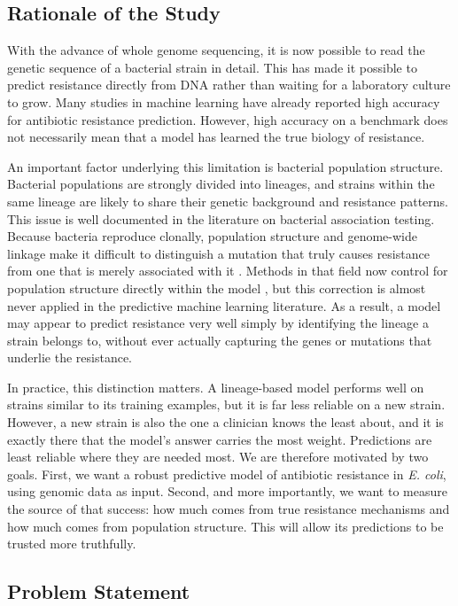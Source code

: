 \documentclass[journal]{IEEEtran}
\begin{document}
\subsection{Rationale of the Study}

With the advance of whole genome sequencing, it is now possible to read the
genetic sequence of a bacterial strain in detail. This has made it possible to
predict resistance directly from DNA rather than waiting for a laboratory culture
to grow. Many studies in machine learning have already reported high accuracy for
antibiotic resistance prediction. However, high accuracy on a benchmark does not
necessarily mean that a model has learned the true biology of resistance.

An important factor underlying this limitation is bacterial population structure.
Bacterial populations are strongly divided into lineages, and strains within the
same lineage are likely to share their genetic background and resistance patterns.
This issue is well documented in the literature on bacterial association testing.
Because bacteria reproduce clonally, population structure and genome-wide linkage
make it difficult to distinguish a mutation that truly causes resistance from one
that is merely associated with it \cite{saber2020bacgwas}. Methods in that field
now control for population structure directly within the model
\cite{lees2020pyseer}, but this correction is almost never applied in the
predictive machine learning literature. As a result, a model may appear to predict
resistance very well simply by identifying the lineage a strain belongs to,
without ever actually capturing the genes or mutations that underlie the
resistance.

In practice, this distinction matters. A lineage-based model performs well on
strains similar to its training examples, but it is far less reliable on a new
strain. However, a new strain is also the one a clinician knows the least about,
and it is exactly there that the model's answer carries the most weight.
Predictions are least reliable where they are needed most. We are therefore
motivated by two goals. First, we want a robust predictive model of antibiotic
resistance in \textit{E. coli}, using genomic data as input. Second, and more
importantly, we want to measure the source of that success: how much comes from
true resistance mechanisms and how much comes from population structure. This will
allow its predictions to be trusted more truthfully.

\subsection{Problem Statement}
\end{document}

